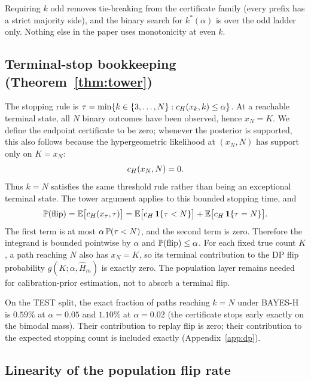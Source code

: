 \begin{remark}
Requiring $k$ odd removes tie-breaking from the certificate family
(every prefix has a strict majority side), and the binary search for
$k^*(\alpha)$ is over the odd ladder only. Nothing else in the paper uses
monotonicity at even $k$.
\end{remark}

\subsection{Terminal-stop bookkeeping (Theorem~\ref{thm:tower})}

The stopping rule is
$\tau=\min\{k\in\{3,\ldots,N\}:\cert(x_k,k)\le\alpha\}$.  At a reachable
terminal state, all $N$ binary outcomes have been observed, hence $x_N=K$.
We define the endpoint certificate to be zero; whenever the posterior is
supported, this also follows because the hypergeometric likelihood at
$(x_N,N)$ has support only on $K=x_N$:
\[
\cert(x_N,N)=0.
\]
Thus $k=N$ satisfies the same threshold rule rather than being an exceptional
terminal state. The tower argument applies to this bounded stopping time,
and
\[
\P(\flip)=\E\big[\cert(x_\tau,\tau)\big]
=\E\big[\cert\,\mathbf 1\{\tau<N\}\big]+\E\big[\cert\,\mathbf 1\{\tau=N\}\big].
\]
The first term is at most $\alpha\,\P(\tau<N)$, and the second term is zero.
Therefore the integrand is bounded pointwise by $\alpha$ and
$\P(\flip)\le\alpha$.  For each fixed true count $K$, a path reaching $N$
also has $x_N=K$, so its terminal contribution to the DP flip probability
$g(K;\alpha,\widehat H_m)$ is exactly zero.  The population layer remains
needed for calibration-prior estimation, not to absorb a terminal flip.

\begin{remark}
On the TEST split, the exact fraction of paths reaching $k=N$ under
BAYES-H is $0.59\%$ at $\alpha=0.05$ and $1.10\%$ at $\alpha=0.02$ (the
certificate stops early exactly on the bimodal mass). Their contribution to
replay flip is zero; their contribution to the expected stopping count is
included exactly (Appendix~\ref{app:dp}).
\end{remark}

\subsection{Linearity of the population flip rate}

